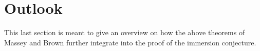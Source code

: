 % 

\chapter{Outlook}\label{chap:outlook}
This last section is meant to give an overview on how the above
theorems of Massey and Brown further integrate into the proof of the
immersion conjecture.

